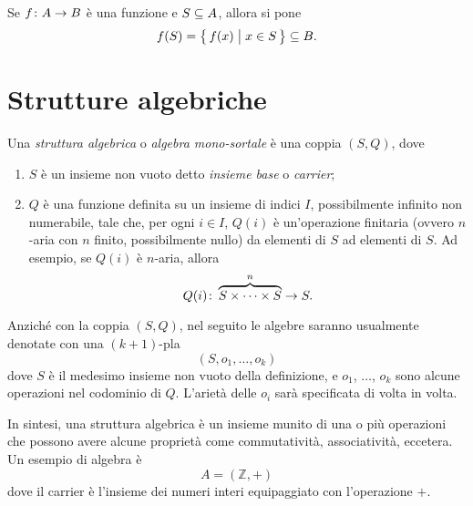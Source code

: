 Se $\mathord{f}\colon A\to B$ \`e una funzione e $S \subseteq A$, allora si pone
\[
    f(S) = \bigl\{\, f(x) \bigm| x \in S \,\bigr\} \subseteq B.
\]


\section{Strutture algebriche}

\begin{definizione} 
Una \emph{struttura algebrica} o \emph{algebra mono-sortale}
\`e una coppia $(S, Q)$, dove
\begin{enumerate}
\item
$S$ \`e un insieme non vuoto detto \emph{insieme base} o \emph{carrier};
\item
$Q$ \`e una funzione definita su un insieme di indici $I$,
possibilmente infinito non numerabile, tale che, per ogni $i \in I$,
$Q(i)$ \`e un'operazione finitaria (ovvero $n$-aria con $n$ finito,
possibilmente nullo) da elementi di $S$ ad elementi di $S$. Ad
esempio, se $Q(i)$ \`e $n$-aria, allora
\[
    \mathord{Q(i)}\colon\overbrace{S \times\cdots\times S}^{n}\to S.
\]
\end{enumerate}
\end{definizione}

Anzich\'e con la coppia $(S, Q)$, nel seguito le algebre saranno
usualmente denotate con una $(k+1)$-pla
\[
    (S, o_1, \ldots, o_k)
\]
dove $S$ \`e il medesimo insieme non vuoto della definizione, e $o_1$,
$\ldots$, $o_k$ sono alcune operazioni nel codominio di $Q$. L'ariet\`a
delle $o_i$ sar\`a specificata di volta in volta.

In sintesi, una struttura algebrica è un insieme munito di una o più operazioni che possono avere alcune proprietà come commutatività, associatività, eccetera. Un esempio di algebra è 
\[
    A = (\mathbb{Z}, +)
\]
dove il carrier è l'insieme dei numeri interi equipaggiato con l'operazione $+$.

